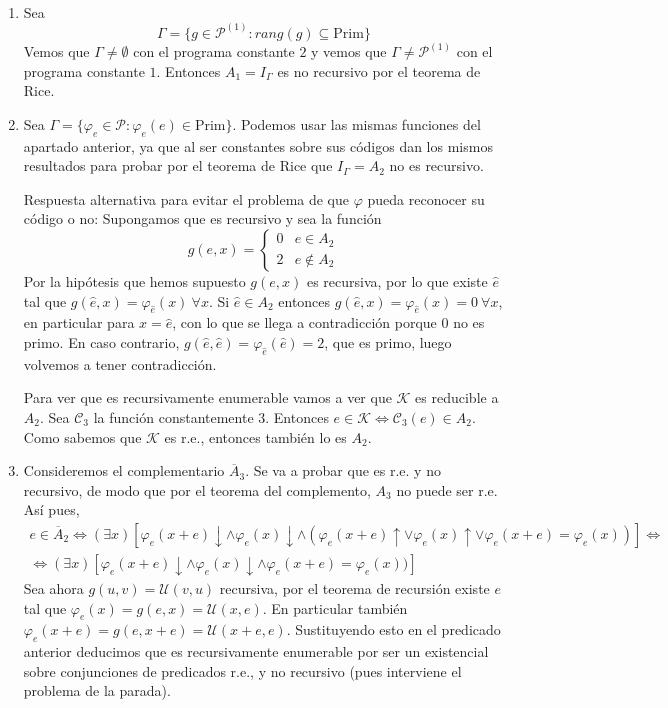 \documentclass[11pt]{article}
\let \sii \Leftrightarrow
\begin{document}
\begin{solucion}\
\begin{enumerate}
	\item Sea
	\[  Γ = \{g \in \mathcal{P}^{(1)} : rang(g) \subseteq \text{Prim}\} \]
	Vemos que $Γ \neq \emptyset$ con el programa constante $2$ y vemos que $Γ \neq \mathcal{P}^{(1)}$ con el programa constante $1$. Entonces $A_1 = I_Γ$ es no recursivo por el teorema de Rice.
	
	\item Sea $\Gamma=\{ \varphi_e\in\mathcal{P}: \varphi_e(e)\in$Prim$\}$. Podemos usar las mismas funciones del apartado anterior, ya que al ser constantes sobre sus códigos dan los mismos resultados para probar por el teorema de Rice que $I_{\Gamma}=A_2$ no es recursivo.
	
	Respuesta alternativa para evitar el problema de que $\varphi$ pueda reconocer su código o no:
	Supongamos que es recursivo y sea la función 
	\[
	g(e,x)=\begin{cases}
	0 & e\in A_2\\
	2 & e\notin A_2
	\end{cases}
	\]
	Por la hipótesis que hemos supuesto $g(e,x)$ es recursiva, por lo que existe $\hat{e}$ tal que $g(\hat{e},x)=\varphi_{\hat{e}}(x)\ \forall x$. Si $\hat{e}\in A_2$ entonces $g(\hat{e},x)=\varphi_{\hat{e}}(x)=0\ \forall x$, en particular para $x=\hat{e}$, con lo que se llega a contradicción porque 0 no es primo. En caso contrario, $g(\hat{e},\hat{e})=\varphi_{\hat{e}}(\hat{e})=2$, que es primo, luego volvemos a tener contradicción.
	
	Para ver que es recursivamente enumerable vamos a ver que $\mathcal{K}$ es reducible a $A_2$. Sea $\mathcal{C}_3$ la función constantemente 3. Entonces $e\in\mathcal{K}\Leftrightarrow \mathcal{C}_3(e)\in A_2$. Como sabemos que $\mathcal{K}$ es r.e., entonces también lo es $A_2$. 
	
	\item Consideremos el complementario $\overline{A}_3$. Se va a probar que es r.e. y no recursivo, de modo que por el teorema del complemento, $A_3$ no puede ser r.e. Así pues, 
\begin{gather*}
e\in\overline{A}_2\sii (\exists x)[\varphi_e(x+e)\downarrow\land\varphi_e(x)\downarrow\land(\varphi_e(x+e)\uparrow\lor\varphi_e(x)\uparrow\lor \varphi_e(x+e)=\varphi_e(x))]\sii\\
\sii (\exists x)[\varphi_e(x+e)\downarrow\land\varphi_e(x)\downarrow\land\varphi_e(x+e)=\varphi_e(x))]
\end{gather*}
Sea ahora $g(u,v)=\mathcal{U}(v,u)$ recursiva, por el teorema de recursión existe $e$ tal que $\varphi_e(x)=g(e,x)=\mathcal{U}(x,e)$. En particular también $\varphi_e(x+e)=g(e,x+e)=\mathcal{U}(x+e,e)$. Sustituyendo esto en el predicado anterior deducimos que es recursivamente enumerable por ser un existencial sobre conjunciones de predicados r.e., y no recursivo (pues interviene el problema de la parada).
\end{enumerate}
\end{solucion}
\end{document}
